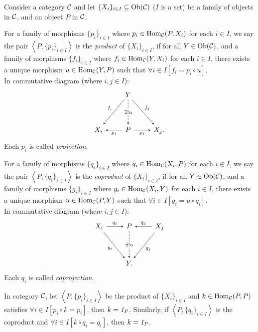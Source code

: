 \documentclass{article}
\begin{document}
\begin{defi}
	Consider a category $\mathcal{C}$ and let $\{X_i\}_{i\in I}\subseteq\mathrm{Ob}(\mathcal{C})$ ($I$ is a set) be a family of objects in $\mathcal{C}$, and an object $P$ in $\mathcal{C}$.
	
	For a family of morphisms $\{p_i\}_{i\in I}$ where $p_i\in\mathrm{Hom}_{\mathcal{C}}(P,X_i)$ for each $i\in I$, we say the pair $\left<P,\{p_i\}_{i\in I}\right>$ is the \emph{product} of $\{X_i\}_{i\in I}$, if for all $Y\in\mathrm{Ob}(\mathcal{C})$, and a family of morphisms $\{f_i\}_{i\in I}$ where $f_i\in\mathrm{Hom}_{\mathcal{C}}(Y,X_i)$ for each $i\in I$, there exists a unique morphism $u\in\mathrm{Hom}_{\mathcal{C}}(Y,P)$ such that $\forall i\in I[f_i=p_i\circ u]$.\\
	In commutative diagram (where $i,j\in I$):
	\[\begin{tikzcd}
		& Y \arrow[->,>=stealth, dd, "\exists!u" description, dashed] \arrow[->,>=stealth, rdd, "f_j"] \arrow[->,>=stealth, ldd, "f_i"'] & \\ & & \\
		X_i & P \arrow[->,>=stealth, l, "p_i"] \arrow[->,>=stealth, r, "p_j"'] & X_j.
	\end{tikzcd}\]
	Each $p_i$ is called \emph{projection}.
	
	For a family of morphisms $\{q_i\}_{i\in I}$ where $q_i\in\mathrm{Hom}_{\mathcal{C}}(X_i,P)$ for each $i\in I$, we say the pair $\left<P,\{q_i\}_{i\in I}\right>$ is the \emph{coproduct} of $\{X_i\}_{i\in I}$, if for all $Y\in\mathrm{Ob}(\mathcal{C})$, and a family of morphisms $\{g_i\}_{i\in I}$ where $g_i\in\mathrm{Hom}_{\mathcal{C}}(X_i,Y)$ for each $i\in I$, there exists a unique morphism $u\in\mathrm{Hom}_{\mathcal{C}}(P,Y)$ such that $\forall i\in I[g_i=u\circ q_i]$.\\
	In commutative diagram (where $i,j\in I$):
	\[\begin{tikzcd}
		X_i \arrow[->,>=stealth, r, "q_i"] \arrow[->,>=stealth, rdd, "g_i"'] & P \arrow[->,>=stealth, dd, "\exists!u" description, dashed] &
		X_j \arrow[->,>=stealth, l, "q_j"'] \arrow[->,>=stealth, ldd, "g_j"] \\ & & \\ & Y.&
	\end{tikzcd}\]
	Each $q_i$ is called \emph{coprojection}.
\end{defi}


\begin{lmm}\label{id recognize}
	In category $\mathcal{C}$, let $\left<P,\{p_i\}_{i\in I}\right>$ be the product of $\{X_i\}_{i\in I}$ and $k\in\mathrm{Hom}_{\mathcal{C}}(P,P)$ satisfies $\forall i\in I[p_i\circ k=p_i]$, then $k=\mathit{1}_P$. Similarly, if $\left<P,\{q_i\}_{i\in I}\right>$ is the coproduct and $\forall i\in I[k\circ q_i=q_i]$, then $k=\mathit{1}_P$.
\end{lmm}
\end{document}

